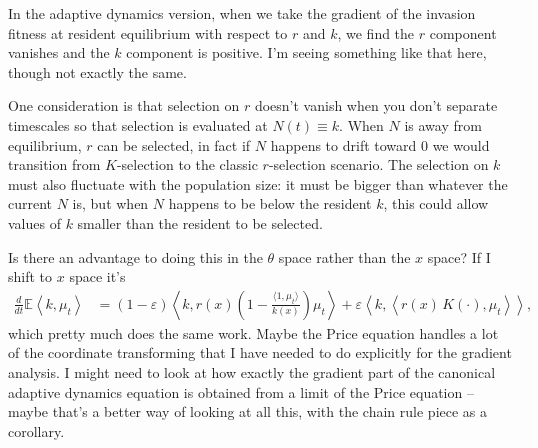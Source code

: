 \documentclass[11pt]{amsart}
\theoremstyle{remark}
\theoremstyle{definition}
\begin{document}
In the adaptive dynamics version, when we take the gradient
of the invasion fitness at resident equilibrium with respect to
$r$ and $k$, we find the $r$ component vanishes and the $k$
component is positive.
I'm seeing something like that here, though not exactly the same.

One consideration is that selection on $r$ doesn't vanish
when you don't separate timescales so that selection is evaluated
at $N(t)\equiv k$.
When $N$ is away from equilibrium, $r$ can be selected,
in fact if $N$ happens to drift toward 0 we would transition
from $K$-selection to the classic $r$-selection scenario.
The selection on $k$ must also fluctuate with the population size:
it must be bigger than whatever the current $N$ is, but
when $N$ happens to be below the resident $k$,
this could allow values of $k$ smaller than the resident to be selected.

Is there an advantage to doing this in the $\theta$ space
rather than the $x$ space?
If I shift to $x$ space it's
\begin{align*}
	\frac{d}{dt}\mathbb{E}\left\langle k, \mu_t \right\rangle
	&= (1-\varepsilon) \left\langle k, r(x) \left( 1 - \frac{\langle 1,\mu_t\rangle}{k(x)} \right) \mu_t \right\rangle 
		+ \varepsilon \left\langle k, \left\langle r(x)\, K(\cdot), \mu_t \right\rangle \right\rangle,
\end{align*}
which pretty much does the same work. 
Maybe the Price equation handles a lot of
the coordinate transforming that I have needed to do explicitly for the
gradient analysis.
I might need to look at how exactly the gradient part of the
canonical adaptive dynamics equation is obtained from a
limit of the Price equation -- maybe that's a better way of
looking at all this, with the chain rule piece as a corollary.

%


\vfill
\end{document}
